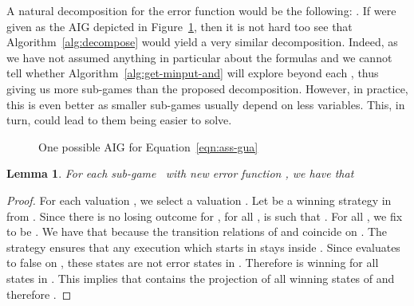 \documentclass[submission,copyright,creativecommons]{eptcs}
\newtheorem{lemma}{Lemma}
\begin{document}
A natural decomposition for the error function  would be the
following: .  If  were given as the AIG depicted in
Figure~\ref{fig:example-aig-2}, then it is not hard too see that
Algorithm~\ref{alg:decompose} would yield a very similar
decomposition.
Indeed, as we have not assumed anything in particular about the formulas 
and  we cannot tell whether Algorithm~\ref{alg:get-minput-and} will explore
beyond each , thus giving us more sub-games than the proposed
decomposition.  However, in practice, this is even better as smaller sub-games
usually depend on less variables. This, in turn, could lead to them being easier
to solve. 


\begin{figure}
\centering
{}
\caption{One possible AIG for Equation~\ref{eqn:ass-gua}}
\label{fig:example-aig-2}
\end{figure}


\begin{lemma}\label{lem:nec-allsub}
  For each sub-game~ with new error function , we have that
  
\end{lemma}
\begin{proof}
  For each valuation , we select a valuation .  Let  be a
  winning strategy in  from .  Since there is no losing
  outcome for , for all ,
   is such that
  .  For all , we fix  to be
  .  We have that
   because the transition relations of
   and  coincide on .  The strategy
   ensures that any execution which starts in
   stays inside
  .  Since 
  evaluates to false on , these states are not error states in
  . Therefore  is winning for all states in
  .  This implies that
   contains the projection of all winning states of  and therefore .
\end{proof}
\end{document}
